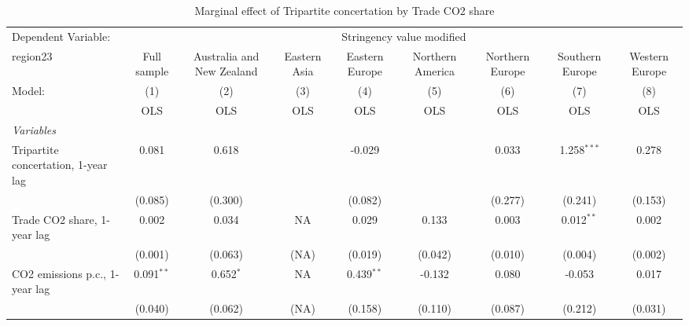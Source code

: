
\begin{table}[htbp]
   \caption{Marginal effect of Tripartite concertation by Trade CO2 share}
   \centering
   \begin{tabular}{lcccccccc}
      \toprule
      Dependent Variable: & \multicolumn{8}{c}{Stringency value modified}\\
      region23                                                          & Full sample   & Australia and New Zealand & Eastern Asia & Eastern Europe & Northern America & Northern Europe & Southern Europe & Western Europe \\   
      Model:                                                            & (1)           & (2)                       & (3)          & (4)            & (5)              & (6)             & (7)             & (8)\\  
                                                                        &  OLS          & OLS                       & OLS          & OLS            & OLS              & OLS             & OLS             & OLS\\  
      \midrule
      \emph{Variables}\\
      Tripartite concertation, 1-year lag                               & 0.081         & 0.618                     &              & -0.029         &                  & 0.033           & 1.258$^{***}$   & 0.278\\   
                                                                        & (0.085)       & (0.300)                   &              & (0.082)        &                  & (0.277)         & (0.241)         & (0.153)\\   
      Trade CO2 share, 1-year lag                                       & 0.002         & 0.034                     & NA           & 0.029          & 0.133            & 0.003           & 0.012$^{**}$    & 0.002\\   
                                                                        & (0.001)       & (0.063)                   & (NA)         & (0.019)        & (0.042)          & (0.010)         & (0.004)         & (0.002)\\   
      CO2 emissions p.c., 1-year lag                                    & 0.091$^{**}$  & 0.652$^{*}$               & NA           & 0.439$^{**}$   & -0.132           & 0.080           & -0.053          & 0.017\\   
                                                                        & (0.040)       & (0.062)                   & (NA)         & (0.158)        & (0.110)          & (0.087)         & (0.212)         & (0.031)\\   

\end{tabular}
\end{table}
